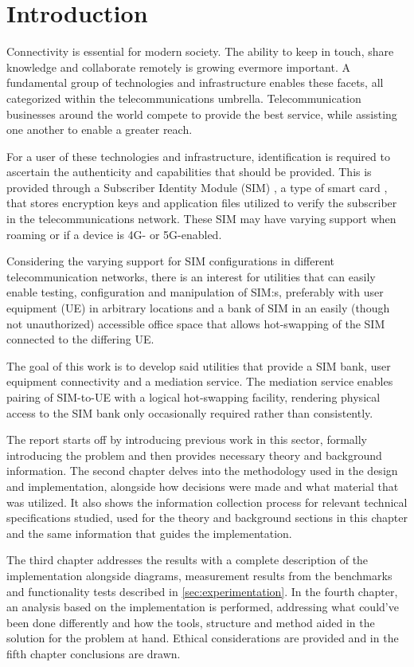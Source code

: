\chapter{Introduction}

Connectivity is essential for modern society. The ability to keep
in touch, share knowledge and collaborate remotely is growing
evermore important. A fundamental group of technologies and
infrastructure enables these facets, all categorized within the
telecommunications umbrella. Telecommunication businesses around
the world compete to provide the best service, while assisting one
another to enable a greater reach.

For a user of these technologies and infrastructure, identification
is required to ascertain the authenticity and capabilities that
should be provided. This is provided through a Subscriber Identity
Module (SIM) \cite{etsi-ts-131-102}, a type of smart card
\cite{etsi-ts-102-221}, that stores encryption keys and application
files utilized to verify the subscriber in the telecommunications
network. These SIM may have varying support when roaming or if a
device is 4G- or 5G-enabled.

Considering the varying support for SIM configurations in different
telecommunication networks, there is an interest for utilities that
can easily enable testing, configuration and manipulation of SIM:s,
preferably with user equipment (UE) in arbitrary locations and a
bank of SIM in an easily (though not unauthorized) accessible
office space that allows hot-swapping of the SIM connected to the
differing UE.

The goal of this work is to develop said utilities that provide a
SIM bank, user equipment connectivity and a mediation service. The
mediation service enables pairing of SIM-to-UE with a logical
hot-swapping facility, rendering physical access to the SIM bank
only occasionally required rather than consistently.

The report starts off by introducing previous work in this sector,
formally introducing the problem and then provides necessary theory
and background information. The second chapter delves into the
methodology used in the design and implementation, alongside how
decisions were made and what material that was utilized. It also
shows the information collection process for relevant technical
specifications studied, used for the theory and background sections
in this chapter and the same information that guides the
implementation.

The third chapter addresses the results with a complete description
of the implementation alongside diagrams, measurement results from
the benchmarks and functionality tests described in
\ref{sec:experimentation}. In the fourth chapter, an analysis based
on the implementation is performed, addressing what could've been
done differently and how the tools, structure and method aided in
the solution for the problem at hand. Ethical considerations are
provided and in the fifth chapter conclusions are drawn.

